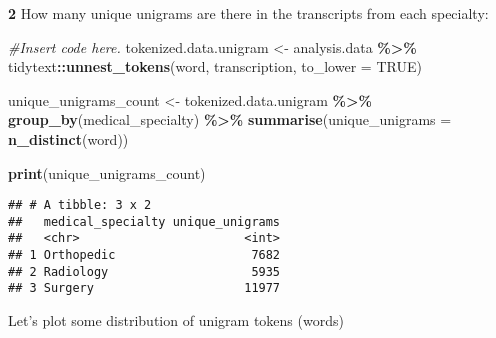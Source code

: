\documentclass[
]{article}
\newenvironment{Shaded}{\begin{snugshade}}{\end{snugshade}}
\newcommand{\AttributeTok}[1]{\textcolor[rgb]{0.13,0.29,0.53}{#1}}
\newcommand{\CommentTok}[1]{\textcolor[rgb]{0.56,0.35,0.01}{\textit{#1}}}
\newcommand{\ConstantTok}[1]{\textcolor[rgb]{0.56,0.35,0.01}{#1}}
\newcommand{\FunctionTok}[1]{\textcolor[rgb]{0.13,0.29,0.53}{\textbf{#1}}}
\newcommand{\NormalTok}[1]{#1}
\newcommand{\OtherTok}[1]{\textcolor[rgb]{0.56,0.35,0.01}{#1}}
\newcommand{\SpecialCharTok}[1]{\textcolor[rgb]{0.81,0.36,0.00}{\textbf{#1}}}
\begin{document}
\textbf{2} How many unique unigrams are there in the transcripts from
each specialty:

\begin{Shaded}
\begin{Highlighting}[]
\CommentTok{\#Insert code here. }
\NormalTok{tokenized.data.unigram }\OtherTok{\textless{}{-}}\NormalTok{ analysis.data }\SpecialCharTok{\%\textgreater{}\%}
\NormalTok{  tidytext}\SpecialCharTok{::}\FunctionTok{unnest\_tokens}\NormalTok{(word, transcription, }\AttributeTok{to\_lower =} \ConstantTok{TRUE}\NormalTok{)}

\NormalTok{unique\_unigrams\_count }\OtherTok{\textless{}{-}}\NormalTok{ tokenized.data.unigram }\SpecialCharTok{\%\textgreater{}\%}
  \FunctionTok{group\_by}\NormalTok{(medical\_specialty) }\SpecialCharTok{\%\textgreater{}\%}
  \FunctionTok{summarise}\NormalTok{(}\AttributeTok{unique\_unigrams =} \FunctionTok{n\_distinct}\NormalTok{(word))}

\FunctionTok{print}\NormalTok{(unique\_unigrams\_count)}
\end{Highlighting}
\end{Shaded}

\begin{verbatim}
## # A tibble: 3 x 2
##   medical_specialty unique_unigrams
##   <chr>                       <int>
## 1 Orthopedic                   7682
## 2 Radiology                    5935
## 3 Surgery                     11977
\end{verbatim}

Let's plot some distribution of unigram tokens (words)
\end{document}
